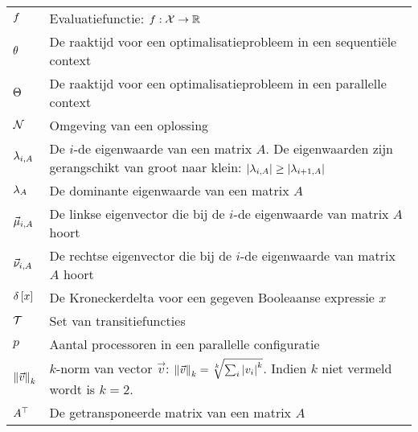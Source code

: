 \begin{flushleft}
\begin{tabularx}{\textwidth}{@{}p{20mm}X@{}}
    $\evalfun$							& Evaluatiefunctie: $\funsig{\evalfun}{\ConfigSet}{\RealSet}$\\
    $\hittime$							& De raaktijd voor een optimalisatieprobleem in een sequenti\"ele context\\
    $\phittime$							& De raaktijd voor een optimalisatieprobleem in een parallelle context\\
    $\neighbr$							& Omgeving van een oplossing\\
    $\ev[i,A]$							& De $i$-de eigenwaarde van een matrix $A$. De eigenwaarden zijn gerangschikt van groot naar klein: $\abs{\ev[i,A]}\geq\abs{\ev[i+1,A]}$\\
    $\ev[A]$							& De dominante eigenwaarde van een matrix $A$\\
    $\evl[i,A]$							& De linkse eigenvector die bij de $i$-de eigenwaarde van matrix $A$ hoort\\
    $\evr[i,A]$							& De rechtse eigenvector die bij de $i$-de eigenwaarde van matrix $A$ hoort\\
    $\krdelta{x}$						& De Kroneckerdelta voor een gegeven Booleaanse expressie $x$\\
    $\TranSet$							& Set van transitiefuncties\\
    $p$									& Aantal processoren in een parallelle configuratie\\
    $\dabs[k]{\vec{v}}$					& $k$-norm van vector $\vec{v}$: $\dabs[k]{\vec{v}}=\sqrt[k]{\sum_i\abs{v_i}^k}$. Indien $k$ niet vermeld wordt is $k=2$.\\
    $\transpose{A}$						& De getransponeerde matrix van een matrix $A$\\
  \end{tabularx}
\end{flushleft}